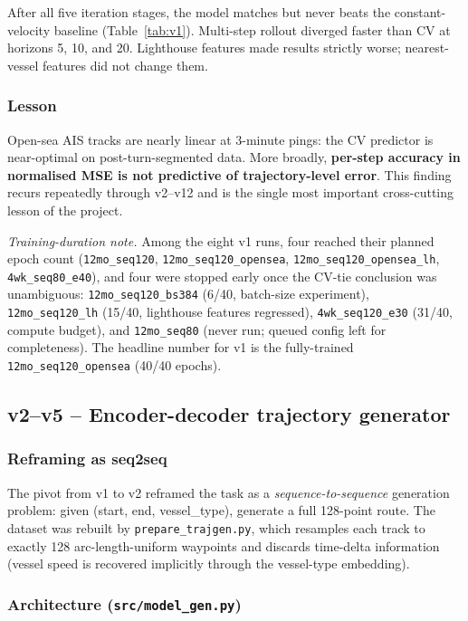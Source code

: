 \documentclass[11pt,a4paper]{article}
\begin{document}
After all five iteration stages, the model matches but never beats the
constant-velocity baseline (Table~\ref{tab:v1}).  Multi-step rollout
diverged faster than CV at horizons 5, 10, and 20.  Lighthouse features
made results strictly worse; nearest-vessel features did not change them.

\subsubsection{Lesson}

Open-sea AIS tracks are nearly linear at 3-minute pings: the CV predictor is
near-optimal on post-turn-segmented data.
More broadly, \textbf{per-step accuracy in normalised MSE is not predictive of
trajectory-level error}.
This finding recurs repeatedly through v2--v12 and is the single most important
cross-cutting lesson of the project.

\noindent\textit{Training-duration note.}
Among the eight v1 runs, four reached their planned epoch count
(\texttt{12mo\_seq120}, \texttt{12mo\_seq120\_opensea},
\texttt{12mo\_seq120\_opensea\_lh}, \texttt{4wk\_seq80\_e40}),
and four were stopped early once the CV-tie conclusion was unambiguous:
\texttt{12mo\_seq120\_bs384} (6/40, batch-size experiment),
\texttt{12mo\_seq120\_lh} (15/40, lighthouse features regressed),
\texttt{4wk\_seq120\_e30} (31/40, compute budget),
and \texttt{12mo\_seq80} (never run; queued config left for completeness).
The headline number for v1 is the fully-trained
\texttt{12mo\_seq120\_opensea} (40/40 epochs).

\subsection{v2--v5 -- Encoder-decoder trajectory generator}
\label{sec:v2v5}

\subsubsection{Reframing as seq2seq}

The pivot from v1 to v2 reframed the task as a \emph{sequence-to-sequence}
generation problem: given (start, end, vessel\_type), generate a full 128-point
route.
The dataset was rebuilt by \texttt{prepare\_trajgen.py}, which resamples each
track to exactly 128 arc-length-uniform waypoints and discards time-delta
information (vessel speed is recovered implicitly through the vessel-type embedding).

\subsubsection{Architecture (\texttt{src/model\_gen.py})}
\end{document}
